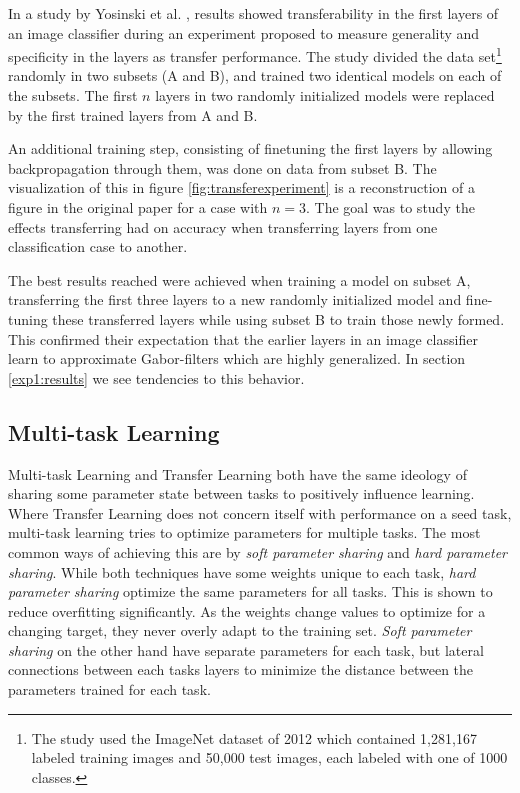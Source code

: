 In a study by Yosinski et al. \cite{yosinski2014transferable}, results showed transferability in the first layers of an image classifier during an experiment proposed to measure generality and specificity in the layers as transfer performance. The study divided the data set\footnote{The study used the ImageNet dataset of 2012 which contained 1,281,167 labeled training images and 50,000 test images, each labeled with one of 1000 classes.} randomly in two subsets (A and B), and trained two identical models on each of the subsets. The first \(n\) layers in two randomly initialized models were replaced by the first trained layers from A and B. 

An additional training step, consisting of finetuning the first layers by allowing backpropagation through them, was done on data from subset B. The visualization of this in figure \ref{fig:transferexperiment} is a reconstruction of a figure in the original paper for a case with \(n=3\). The goal was to study the effects transferring had on accuracy when transferring layers from one classification case to another. 

The best results reached were achieved when training a model on subset A, transferring the first three layers to a new randomly initialized model and fine-tuning these transferred layers while using subset B to train those newly formed. This confirmed their expectation that the earlier layers in an image classifier learn to approximate Gabor-filters which are highly generalized. In section \ref{exp1:results} we see tendencies to this behavior. 

\subsection{Multi-task Learning}
Multi-task Learning and Transfer Learning both have the same ideology of sharing some parameter state between tasks to positively influence learning. Where Transfer Learning does not concern itself with performance on a seed task, multi-task learning tries to optimize parameters for multiple tasks. The most common ways of achieving this are by \textit{soft parameter sharing} and \textit{hard parameter sharing}. While both techniques have some weights unique to each task, \textit{hard parameter sharing} optimize the same parameters for all tasks. This is shown to reduce overfitting\cite{hardparametersharing} significantly. As the weights change values to optimize for a changing target, they never overly adapt to the training set. \textit{Soft parameter sharing} on the other hand have separate parameters for each task, but lateral connections between each tasks layers to minimize the distance between the parameters trained for each task.

